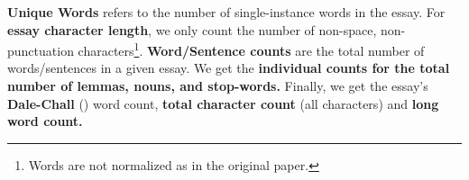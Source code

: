 \textbf{Unique Words} refers to the number of single-instance words in the essay. For \textbf{essay character length}, we only count the number of non-space, non-punctuation characters\footnote{Words are not normalized as in the original paper.}. \textbf{Word/Sentence counts} are the total number of words/sentences in a given essay. We get the \textbf{individual counts for the total number of lemmas, nouns, and stop-words.} Finally, we get the essay's \textbf{Dale-Chall} (\cite{dale1948}) word count, \textbf{total character count} (all characters) and \textbf{long word count.}


